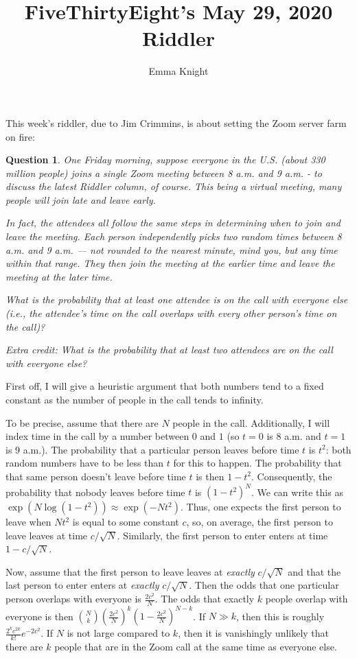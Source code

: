 \documentclass[11pt]{article}
\title{FiveThirtyEight's May 29, 2020 Riddler}
\author{Emma Knight}
\newtheorem{question}[theorem]{Question}
\theoremstyle{definition}
\begin{document}
\maketitle
This week's riddler, due to Jim Crimmins, is about setting the Zoom server farm on fire:
\begin{question}
One Friday morning, suppose everyone in the U.S. (about 330 million people) joins a single Zoom meeting between 8 a.m. and 9 a.m. - to discuss the latest Riddler column, of course. This being a virtual meeting, many people will join late and leave early.

In fact, the attendees all follow the same steps in determining when to join and leave the meeting. Each person independently picks two random times between 8 a.m. and 9 a.m. — not rounded to the nearest minute, mind you, but any time within that range. They then join the meeting at the earlier time and leave the meeting at the later time.

What is the probability that at least one attendee is on the call with everyone else (i.e., the attendee’s time on the call overlaps with every other person’s time on the call)?

Extra credit: What is the probability that at least two attendees are on the call with everyone else?
\end{question}
First off, I will give a heuristic argument that both numbers tend to a fixed constant as the number of people in the call tends to infinity.

To be precise, assume that there are $N$ people in the call.  Additionally, I will index time in the call by a number between $0$ and $1$ (so $t = 0$ is 8 a.m. and $t = 1$ is 9 a.m.).  The probability that a particular person leaves before time $t$ is $t^2$: both random numbers have to be less than $t$ for this to happen.  The probability that that same person doesn't leave before time $t$ is then $1-t^2$.  Consequently, the probability that nobody leaves before time $t$ is $(1-t^2)^N$.  We can write this as $\exp(N\log(1-t^2)) \approx \exp(-Nt^2)$.  Thus, one expects the first person to leave when $Nt^2$ is equal to some constant $c$, so, on average, the first person to leave leaves at time $c/\sqrt{N}$.  Similarly, the first person to enter enters at time $1-c/\sqrt{N}$.

Now, assume that the first person to leave leaves at \emph{exactly} $c/\sqrt{N}$ and that the last person to enter enters at \emph{exactly} $c/\sqrt{N}$.  Then the odds that one particular person overlaps with everyone is $\frac{2c^2}{N}$.  The odds that exactly $k$ people overlap with everyone is then $\binom{N}{k}\left(\frac{2c^2}{N}\right)^k(1-\frac{2c^2}{N})^{N-k}$.  If $N \gg k$, then this is roughly $\frac{2^kc^{2k}}{k!} e^{-2c^2}$.  If $N$ is not large compared to $k$, then it is vanishingly unlikely that there are $k$ people that are in the Zoom call at the same time as everyone else.
\end{document}
